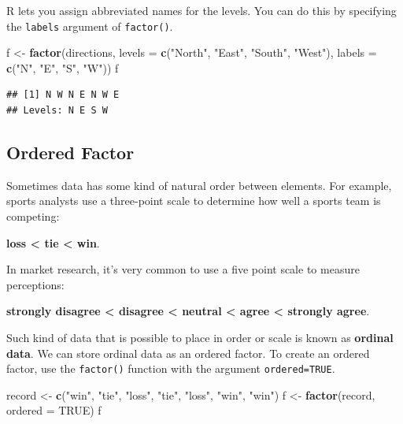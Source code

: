 \documentclass[
]{book}
\newenvironment{Shaded}{\begin{snugshade}}{\end{snugshade}}
\newcommand{\DataTypeTok}[1]{\textcolor[rgb]{0.13,0.29,0.53}{#1}}
\newcommand{\KeywordTok}[1]{\textcolor[rgb]{0.13,0.29,0.53}{\textbf{#1}}}
\newcommand{\NormalTok}[1]{#1}
\newcommand{\OtherTok}[1]{\textcolor[rgb]{0.56,0.35,0.01}{#1}}
\newcommand{\StringTok}[1]{\textcolor[rgb]{0.31,0.60,0.02}{#1}}
\begin{document}
R lets you assign abbreviated names for the levels. You can do this by specifying the \texttt{labels} argument of \texttt{factor()}.

\begin{Shaded}
\begin{Highlighting}[]
\NormalTok{f <-}\StringTok{ }\KeywordTok{factor}\NormalTok{(directions, }\DataTypeTok{levels =} \KeywordTok{c}\NormalTok{(}\StringTok{"North"}\NormalTok{, }\StringTok{"East"}\NormalTok{, }\StringTok{"South"}\NormalTok{,}
    \StringTok{"West"}\NormalTok{), }\DataTypeTok{labels =} \KeywordTok{c}\NormalTok{(}\StringTok{"N"}\NormalTok{, }\StringTok{"E"}\NormalTok{, }\StringTok{"S"}\NormalTok{, }\StringTok{"W"}\NormalTok{))}
\NormalTok{f}
\end{Highlighting}
\end{Shaded}

\begin{verbatim}
## [1] N W N E N W E
## Levels: N E S W
\end{verbatim}

\hypertarget{ordered-factor}{%
\subsection{Ordered Factor}\label{ordered-factor}}

Sometimes data has some kind of natural order between elements. For example, sports analysts use a three-point scale to determine how well a sports team is competing:

\textbf{loss \textless{} tie \textless{} win}.

In market research, it's very common to use a five point scale to measure perceptions:

\textbf{strongly disagree \textless{} disagree \textless{} neutral \textless{} agree \textless{} strongly agree}.

Such kind of data that is possible to place in order or scale is known as \textbf{ordinal data}. We can store ordinal data as an ordered factor. To create an ordered factor, use the \texttt{factor()} function with the argument \texttt{ordered=TRUE}.

\begin{Shaded}
\begin{Highlighting}[]
\NormalTok{record <-}\StringTok{ }\KeywordTok{c}\NormalTok{(}\StringTok{"win"}\NormalTok{, }\StringTok{"tie"}\NormalTok{, }\StringTok{"loss"}\NormalTok{, }\StringTok{"tie"}\NormalTok{, }\StringTok{"loss"}\NormalTok{, }\StringTok{"win"}\NormalTok{, }\StringTok{"win"}\NormalTok{)}
\NormalTok{f <-}\StringTok{ }\KeywordTok{factor}\NormalTok{(record, }\DataTypeTok{ordered =} \OtherTok{TRUE}\NormalTok{)}
\NormalTok{f}
\end{Highlighting}
\end{Shaded}
\end{document}
